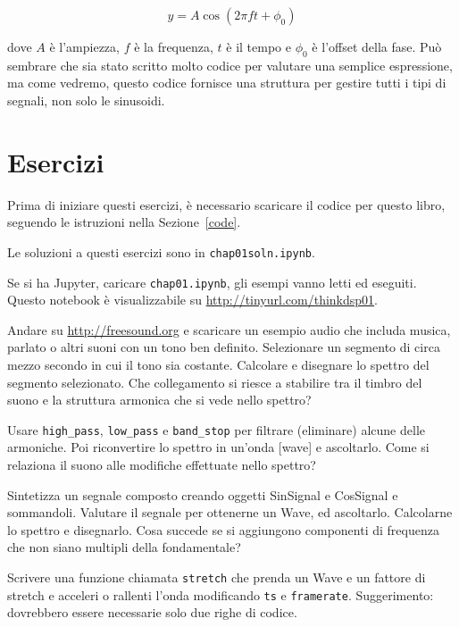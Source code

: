 \documentclass[12pt]{book} \usepackage[width=5.5in,height=8.5in, hmarginratio=3:2,vmarginratio=1:1]{geometry}
\begin{document}
%
\[ y = A \cos (2 \pi f t + \phi_0) \] 

%
dove $A$ è l'ampiezza, $f$ è la frequenza, $t$ è il tempo e $\phi_0$ è l'offset della fase. Può sembrare che sia stato scritto molto codice per valutare una semplice espressione, ma come vedremo, questo codice fornisce una struttura per gestire tutti i tipi di segnali, non solo le sinusoidi.

\section{Esercizi} 

Prima di iniziare questi esercizi, è necessario scaricare il codice per questo libro, seguendo le istruzioni nella Sezione~\ref{code}.

Le soluzioni a questi esercizi sono in {\tt chap01soln.ipynb}.

\begin{exercise} Se si ha Jupyter, caricare {\tt chap01.ipynb}, gli esempi vanno letti ed eseguiti. Questo notebook è visualizzabile su \url{http://tinyurl.com/thinkdsp01}. \end{exercise} 

\begin{exercise} Andare su \url{http://freesound.org} e scaricare un esempio audio che includa musica, parlato o altri suoni con un tono ben definito. Selezionare un segmento di circa mezzo secondo in cui il tono sia costante. Calcolare e disegnare lo spettro del segmento selezionato. Che collegamento si riesce a stabilire tra il timbro del suono e la struttura armonica che si vede nello spettro?

Usare \verb"high_pass", \verb"low_pass" e \verb"band_stop" per filtrare (eliminare) alcune delle armoniche. Poi riconvertire lo spettro in un'onda [wave] e ascoltarlo. Come si relaziona il suono alle modifiche effettuate nello spettro? \end{exercise} 

\begin{exercise} Sintetizza un segnale composto creando oggetti SinSignal e CosSignal e sommandoli. Valutare il segnale per ottenerne un Wave, ed ascoltarlo. Calcolarne lo spettro e disegnarlo. Cosa succede se si aggiungono componenti di frequenza che non siano multipli della fondamentale? \end{exercise} 

\begin{exercise} Scrivere una funzione chiamata {\tt stretch} che prenda un Wave e un fattore di stretch e acceleri o rallenti l'onda modificando {\tt ts} e {\tt framerate}. Suggerimento: dovrebbero essere necessarie solo due righe di codice. \end{exercise} 
\end{document}
